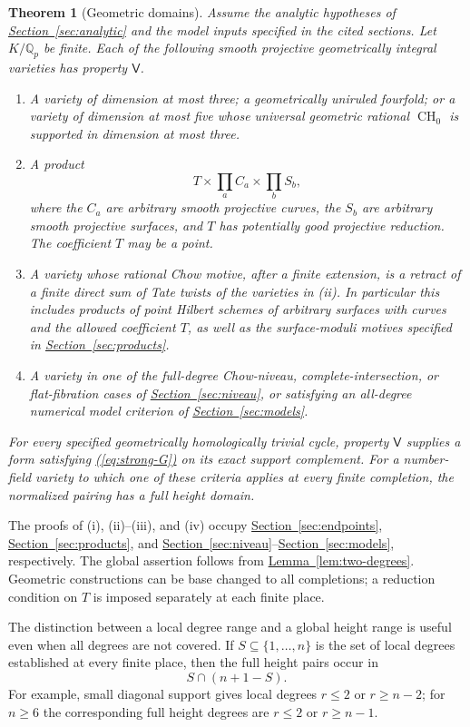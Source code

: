\documentclass[11pt,a4paper]{article}
\newtheorem{theorem}{Theorem}[section]
\theoremstyle{definition}
\theoremstyle{remark}\newtheorem{remark}[theorem]{Remark}
\numberwithin{equation}{section}
\newcommand{\Q}{\mathbb Q}\newcommand{\R}{\mathbb R}\newcommand{\C}{\mathbb C}
\newcommand{\CH}{\operatorname{CH}}\newcommand{\an}{\mathrm{an}}
\newcommand{\secref}[1]{\hyperref[#1]{\textcolor{sectionlink}{Section~\ref*{#1}}}}
\newcommand{\lemref}[1]{\hyperref[#1]{\textcolor{resultlink}{Lemma~\ref*{#1}}}}
\renewcommand{\eqref}[1]{\hyperref[#1]{\textcolor{equationlink}{(\ref*{#1})}}}
\begin{document}
\begin{theorem}[Geometric domains]\label{thm:geometric-domains}
Assume the analytic hypotheses of \secref{sec:analytic} and the model
inputs specified in the cited sections.
Let $K/\Q_p$ be finite. Each of the following smooth projective
geometrically integral varieties has property $\mathsf V$.
\begin{enumerate}[label=\textup{(\roman*)}]
\item A variety of dimension at most three; a geometrically uniruled
fourfold; or a variety of dimension at most five whose universal
geometric rational $\CH_0$ is supported in dimension at most three.
\item A product
\[
 T\times\prod_a C_a\times\prod_b S_b,
\]
where the $C_a$ are arbitrary smooth projective curves, the $S_b$ are
arbitrary smooth projective surfaces, and $T$ has potentially good
projective reduction. The coefficient $T$ may be a point.
\item A variety whose rational Chow motive, after a finite extension,
is a retract of a finite direct sum of Tate twists of the varieties in
\textup{(ii)}. In particular this includes products of point Hilbert
schemes of arbitrary surfaces with curves and the allowed coefficient
$T$, as well as the surface-moduli motives specified in
\secref{sec:products}.
\item A variety in one of the full-degree Chow-niveau, complete-intersection,
or flat-fibration cases of \secref{sec:niveau}, or satisfying an
all-degree numerical model criterion of \secref{sec:models}.
\end{enumerate}
For every specified geometrically homologically trivial cycle, property
$\mathsf V$ supplies a form satisfying \eqref{eq:strong-G} on its exact
support complement. For a number-field variety to which one of these
criteria applies at every finite completion, the normalized pairing has
a full height domain.
\end{theorem}

The proofs of (i), (ii)--(iii), and (iv) occupy
\secref{sec:endpoints}, \secref{sec:products}, and
\secref{sec:niveau}--\secref{sec:models}, respectively. The global
assertion follows from \lemref{lem:two-degrees}. Geometric constructions
can be base changed to all completions; a reduction condition on $T$ is
imposed separately at each finite place.

The distinction between a local degree range and a global height range
is useful even when all degrees are not covered. If $S\subseteq
\{1,\ldots,n\}$ is the set of local degrees established at every finite
place, then the full height pairs occur in
\begin{equation}\label{eq:range-intersection}
 S\cap(n+1-S).
\end{equation}
For example, small diagonal support gives local degrees $r\leq2$ or
$r\geq n-2$; for $n\geq6$ the corresponding full height degrees are
$r\leq2$ or $r\geq n-1$.
\end{document}
